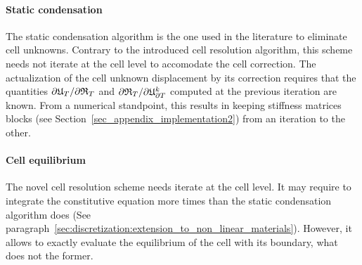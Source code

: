 \paragraph{Static condensation}

The static condensation algorithm is the one used in the literature
\cite{di_pietro_discontinuous-skeletal_2015,cockburn_algorithm_2019,abbas_hybrid_2019-1,abbas_hybrid_2018}
to eliminate cell unknowns. Contrary to the introduced cell resolution
algorithm, this scheme needs not iterate at the cell level to accomodate
the cell correction. The actualization of the cell unknown displacement
by its correction requires that the quantities $\partial
\mathfrak{U}{}_{T} / \partial \mathfrak{R}_{T}$ and $\partial
\mathfrak{R}_{T} / \partial \mathfrak{U}{}_{\partial T}^k$ computed at the
previous iteration are known. From a numerical standpoint, this results
in keeping stiffness matrices blocks (see
Section~\ref{sec_appendix_implementation2}) from an iteration to the
other.

\paragraph{Cell equilibrium}

The novel cell resolution scheme needs iterate at the cell level. It
may require to integrate the constitutive equation more times than the
static condensation algorithm does (See
paragraph~\ref{sec:discretization:extension_to_non_linear_materials}).
However, it allows to exactly evaluate the equilibrium of the cell with
its boundary, what does not the former.


